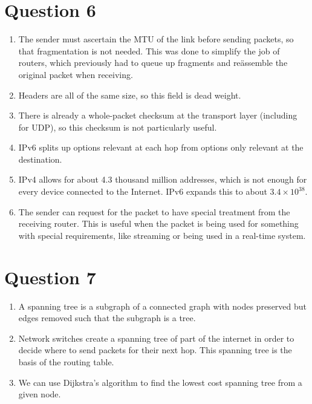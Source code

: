\documentclass{article}
\begin{document}
\section*{Question 6}
\begin{enumerate}
  \item The sender must ascertain the MTU of the link before sending packets, so that fragmentation is not needed. This was done to simplify the job of routers, which previously had to queue up fragments and re\"assemble the original packet when receiving.
  \item Headers are all of the same size, so this field is dead weight.
  \item There is already a whole-packet checksum at the transport layer (including for UDP), so this checksum is not particularly useful.
  \item IPv6 splits up options relevant at each hop from options only relevant at the destination.
  \item IPv4 allows for about 4.3 thousand million addresses, which is not enough for every device connected to the Internet. IPv6 expands this to about $3.4 \times 10^{38}$.
  \item The sender can request for the packet to have special treatment from the receiving router. This is useful when the packet is being used for something with special requirements, like streaming or being used in a real-time system.
\end{enumerate}

\section*{Question 7}
\begin{enumerate}
  \item A spanning tree is a subgraph of a connected graph with nodes preserved but edges removed such that the subgraph is a tree.
  \item Network switches create a spanning tree of part of the internet in order to decide where to send packets for their next hop. This spanning tree is the basis of the routing table.
  \item We can use Dijkstra's algorithm to find the lowest cost spanning tree from a given node.
\end{enumerate}
\end{document}
